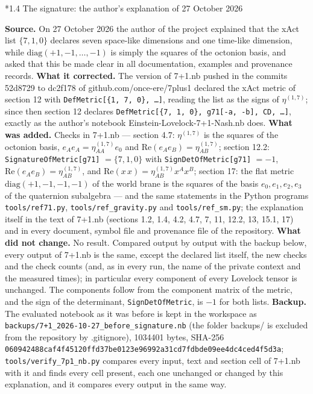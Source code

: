 \documentclass[10pt,a4paper]{article}
\makeatletter
\renewcommand\subsection{\@startsection{subsection}{2}{\z@}{-3.25ex\@plus -1ex \@minus -.2ex}{1.5ex \@plus .2ex}{\normalfont\large\bfseries\raggedright}}
\makeatother
\begin{document}
\subsection*{1.4 The signature: the author’s explanation of 27 October 2026}
\textbf{Source.} On 27 October 2026 the author of the project explained that the xAct list $\{7,1,0\}$ declares seven space-like dimensions and one time-like dimension, while $\mathrm{diag}(+1,-1,\dots,-1)$ is simply the squares of the octonion basis, and asked that this be made clear in all documentation, examples and provenance records. \textbf{What it corrected.} The version of 7+1.nb pushed in the commits 52d8729 to dc2f178 of github.com/once-ere/7plus1 declared the xAct metric of section 12 with \texttt{DefMetric[\{1, 7, 0\}, …]}, reading the list as the signs of $\eta^{(1,7)}$; since then section 12 declares \texttt{DefMetric[\{7, 1, 0\}, g71[-a, -b], CD, …]}, exactly as the author’s notebook Einstein-Lovelock-7+1-Nash.nb does. \textbf{What was added.} Checks in 7+1.nb — section 4.7: $\eta^{(1,7)}$ is the squares of the octonion basis, $e_Ae_A=\eta^{(1,7)}_{AA}e_0$ and $\mathrm{Re}(e_Ae_B)=\eta^{(1,7)}_{AB}$; section 12.2: \texttt{SignatureOfMetric[g71]} $=\{7,1,0\}$ with \texttt{SignDetOfMetric[g71]} $=-1$, $\mathrm{Re}(e_Ae_B)=\eta^{(1,7)}_{AB}$, and $\mathrm{Re}(x\,x)=\eta^{(1,7)}_{AB}x^Ax^B$; section 17: the flat metric $\mathrm{diag}(+1,-1,-1,-1)$ of the world brane is the squares of the basis $e_0,e_1,e_2,e_3$ of the quaternion subalgebra — and the same statements in the Python programs \texttt{tools/\allowbreak{}ref71.py}, \texttt{tools/\allowbreak{}ref\_\allowbreak{}gravity.py} and \texttt{tools/\allowbreak{}ref\_\allowbreak{}sm.py}; the explanation itself in the text of 7+1.nb (sections 1.2, 1.4, 4.2, 4.7, 7, 11, 12.2, 13, 15.1, 17) and in every document, symbol file and provenance file of the repository. \textbf{What did not change.} No result. Compared output by output with the backup below, every output of 7+1.nb is the same, except the declared list itself, the new checks and the check counts (and, as in every run, the name of the private context and the measured times); in particular every component of every Lovelock tensor is unchanged. The components follow from the component matrix of the metric, and the sign of the determinant, \texttt{SignDetOfMetric}, is $-1$ for both lists. \textbf{Backup.} The evaluated notebook as it was before is kept in the workspace as \texttt{backups/\allowbreak{}7+1\_\allowbreak{}2026-10-27\_\allowbreak{}before\_\allowbreak{}signature.nb} (the folder backups/ is excluded from the repository by .gitignore), 1034401 bytes, SHA-256 \texttt{06094248\allowbreak{}8caf4f45\allowbreak{}120ffd37\allowbreak{}be0123e9\allowbreak{}6992a31c\allowbreak{}d7fdbde0\allowbreak{}9ee4dc4c\allowbreak{}ed4f5d3a}; \texttt{tools/\allowbreak{}verify\_\allowbreak{}7p1\_\allowbreak{}nb.py} compares every input, text and section cell of 7+1.nb with it and finds every cell present, each one unchanged or changed by this explanation, and it compares every output in the same way.
\end{document}

